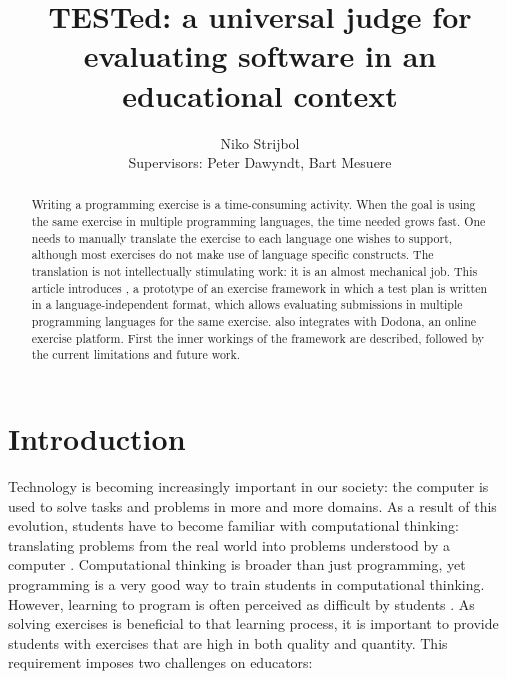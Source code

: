 \documentclass[5p,number]{elsarticle}
\title{TESTed: a universal judge for evaluating software in an educational context}
\author{Niko Strijbol \\ Supervisors: Peter Dawyndt, Bart Mesuere}
\begin{document}
    \setmainfont[Ligatures=TeX,Numbers=OldStyle,Contextuals=Alternate]{Libertinus Serif}
    \setsansfont[Ligatures=TeX,Numbers=OldStyle,Contextuals=Alternate]{Libertinus Sans}
    \setmonofont[Scale=MatchLowercase,Contextuals={Alternate}]{Jetbrains Mono}

    \begin{abstract}
        Writing a programming exercise is a time-consuming activity.
        When the goal is using the same exercise in multiple programming languages, the time needed grows fast.
        One needs to manually translate the exercise to each language one wishes to support, although most exercises do not make use of language specific constructs.
        The translation is not intellectually stimulating work: it is an almost mechanical job.
        This article introduces \tested{}, a prototype of an exercise framework in which a test plan is written in a language-independent format, which allows evaluating submissions in multiple programming languages for the same exercise.
        \tested{} also integrates with Dodona, an online exercise platform.
        First the inner workings of the framework are described, followed by the current limitations and future work.
    \end{abstract}

    \maketitle

    \section{Introduction}\label{sec:introduction}
    
    Technology is becoming increasingly important in our society: the computer is used to solve tasks and problems in more and more domains.
    As a result of this evolution, students have to become familiar with computational thinking: translating problems from the real world into problems understood by a computer \cite{bastiaensen2017}.
    Computational thinking is broader than just programming, yet programming is a very good way to train students in computational thinking.
    However, learning to program is often perceived as difficult by students \cite{10.1145/3293881.3295779}.
    As solving exercises is beneficial to that learning process, it is important to provide students with exercises that are high in both quality and quantity.
    This requirement imposes two challenges on educators:
\end{document}
